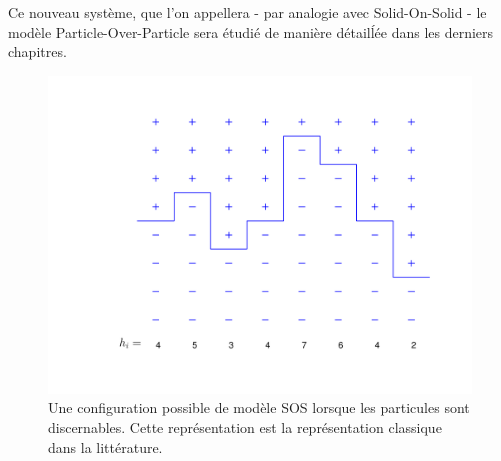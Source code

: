 Ce nouveau système, que l'on appellera - par analogie avec Solid-On-Solid - le modèle Particle-Over-Particle sera étudié de manière détailĺée dans les derniers chapitres.

\begin{figure}[h]
	\centering
	\includegraphics[width=0.7\linewidth]{isingtosos/figure-sos.pdf}
	\caption{Une configuration possible de modèle SOS lorsque les particules sont discernables. Cette représentation est la représentation classique dans la littérature.}
\end{figure}



